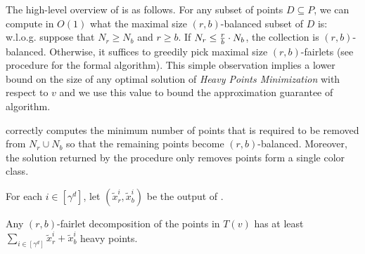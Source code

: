 The high-level overview of \Call{\minHeavy} is as follows. For any subset of points $D\subseteq P$, we can compute in $O(1)$ what the maximal size $(r,b)$-balanced subset of $D$ is: w.l.o.g. suppose that $N_r \geq N_b$ and $r\geq b$. If $N_r \leq {r\over b}\cdot N_b$, the collection is $(r,b)$-balanced. Otherwise, it suffices to greedily pick maximal size $(r,b)$-fairlets (see procedure \Call{\unbalancedPoints} for the formal algorithm). This simple observation implies a lower bound on the size of any optimal solution of \emph{Heavy Points Minimization} with respect to $v$ and we use this value to bound the approximation guarantee of \Call{\minHeavy} algorithm.
\begin{claim}\label{clm:minimum-point-removal}
 correctly computes the minimum number of points that is required to be removed from $N_r \cup N_b$ so that the remaining points become $(r,b)$-balanced. Moreover, the solution returned by the procedure only removes points form a single color class.
\end{claim}   
For each $i\in [\gamma^d]$, let $(\tilde{x}^i_r,\tilde{x}^i_b)$ be the output of . 
\begin{corollary}\label{cor:trivial-lb}
Any $(r,b)$-fairlet decomposition of the points in $T(v)$ has at least $\sum_{i\in[\gamma^d]} \tilde{x}^i_r + \tilde{x}^i_b$ heavy points.
\end{corollary}

